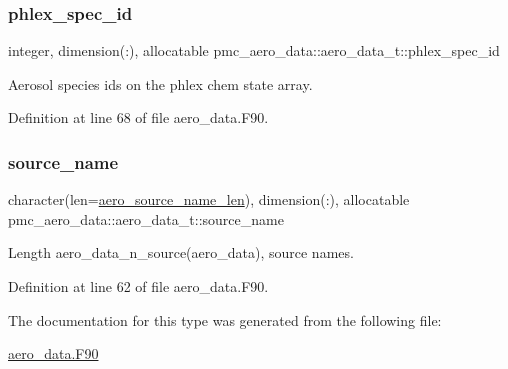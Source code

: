 \subsubsection{\texorpdfstring{phlex\+\_\+spec\+\_\+id}{phlex\_spec\_id}}
{\footnotesize\ttfamily integer, dimension(\+:), allocatable pmc\+\_\+aero\+\_\+data\+::aero\+\_\+data\+\_\+t\+::phlex\+\_\+spec\+\_\+id}



Aerosol species ids on the phlex chem state array. 



Definition at line 68 of file aero\+\_\+data.\+F90.

\mbox{\label{structpmc__aero__data_1_1aero__data__t_a5a54390ff06344e606f8b4e91af74d68}} 
\subsubsection{\texorpdfstring{source\+\_\+name}{source\_name}}
{\footnotesize\ttfamily character(len=\mbox{\hyperlink{namespacepmc__aero__data_adceb28b9bf685995bdcb53cacb52ee42}{aero\+\_\+source\+\_\+name\+\_\+len}}), dimension(\+:), allocatable pmc\+\_\+aero\+\_\+data\+::aero\+\_\+data\+\_\+t\+::source\+\_\+name}



Length {\ttfamily aero\+\_\+data\+\_\+n\+\_\+source(aero\+\_\+data)}, source names. 



Definition at line 62 of file aero\+\_\+data.\+F90.



The documentation for this type was generated from the following file\+:\begin{DoxyCompactItemize}
\item 
\mbox{\hyperlink{aero__data_8_f90}{aero\+\_\+data.\+F90}}\end{DoxyCompactItemize}
